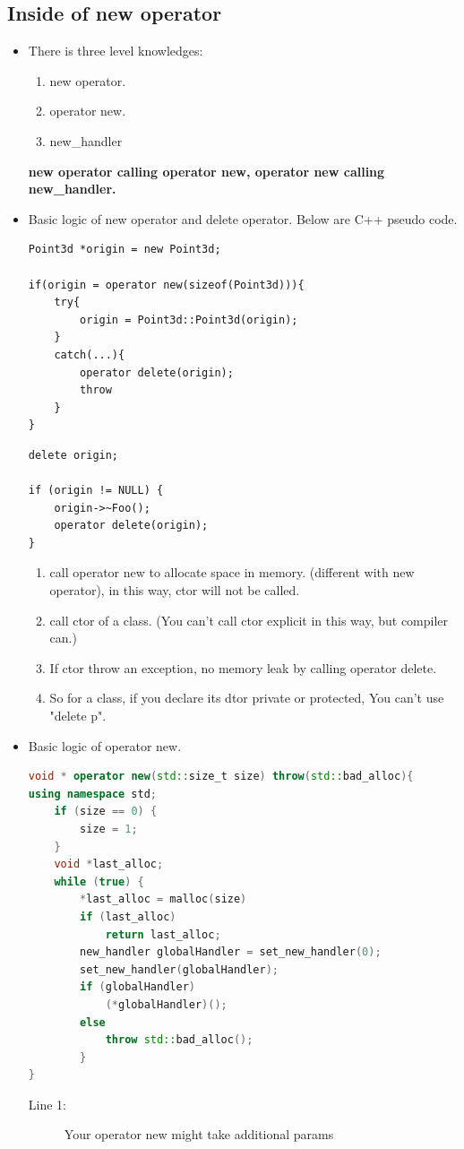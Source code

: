 \documentclass[a4paper,11pt,twoside]{book}
\begin{document}
\subsection{Inside of new operator}
\begin{itemize}
	\item There is three level knowledges: 
	\begin{enumerate}
		\item new operator.
		\item operator new.
		\item new\_handler
	\end{enumerate}
	\textbf{new operator calling operator new, operator new calling new\_handler.} 
	
	\item Basic logic of new operator and delete operator. Below are C++ pseudo code.
\begin{lstlisting}[numbers=none]
Point3d *origin = new Point3d;
	
if(origin = operator new(sizeof(Point3d))){
	try{
		origin = Point3d::Point3d(origin);
	}
	catch(...){
		operator delete(origin);
		throw
	}
}
\end{lstlisting}
	
\begin{lstlisting}[numbers=none]
delete origin;
	
if (origin != NULL) {
	origin->~Foo();
	operator delete(origin);
}
\end{lstlisting}
	
	\begin{enumerate}
		\item call operator new to allocate space in memory. (different with new operator), in this way, ctor will not be called.
		\item call ctor of a class. (You can't call ctor explicit in this way, but compiler can.)
		\item If ctor throw an exception, no memory leak by calling operator delete.
		
		\item So for a class, if you declare its dtor private or protected, You can't use "delete p".
	\end{enumerate}
	
	
\item Basic logic of operator new.
\begin{lstlisting}[frame=single, language=c++]
void * operator new(std::size_t size) throw(std::bad_alloc){
using namespace std; 
	if (size == 0) {   
		size = 1;             
	}                 
	void *last_alloc;
	while (true) {
		*last_alloc = malloc(size)
		if (last_alloc)
			return last_alloc;
		new_handler globalHandler = set_new_handler(0);
		set_new_handler(globalHandler);
		if (globalHandler) 
			(*globalHandler)();
		else 
			throw std::bad_alloc();
		}
}
	\end{lstlisting}
\begin{description}
	\item[Line 1:] Your operator new might take additional params
	

\end{description}
\end{itemize}
\end{document}

